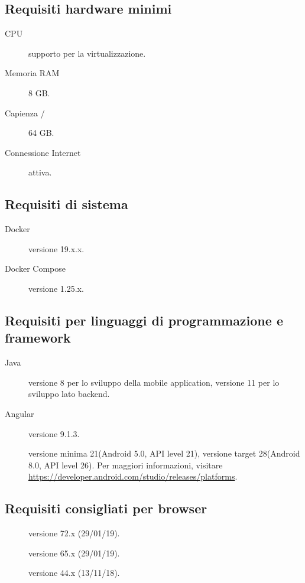 \documentclass[../../manuale-manutentore.tex]{subfiles}
\begin{document}
\subsection{Requisiti hardware minimi}%
\label{sub:requisiti_hardware_minimi}

\begin{description}
    \item[CPU] supporto per la virtualizzazione.
    \item[Memoria RAM] 8 GB\@.
    \item[Capienza /] 64 GB\@.
    \item[Connessione Internet] attiva.
\end{description}

\subsection{Requisiti di sistema}%
\label{sub:requisiti_di_sistema}

\begin{description}
    \item[Docker] versione 19.x.x.
    \item[Docker Compose] versione 1.25.x.
\end{description}

\subsection{Requisiti per linguaggi di programmazione e framework}%
\label{sub:requisiti_per_linguaggi_di_programmazione_e_framwework}

\begin{description}
  \item[Java] versione 8 per lo sviluppo della mobile application, versione 11 per lo sviluppo lato backend.
  \item[Angular] versione 9.1.3.
  \item[] versione minima 21(Android 5.0, API level 21), versione target 28(Android 8.0, API level 26). Per maggiori informazioni, visitare \href{https://developer.android.com/studio/releases/platforms}{https://developer.android.com/studio/releases/platforms}.
\end{description}

\subsection{Requisiti consigliati per browser}%
\label{sub:requisiti_consigliati per browser}

\begin{description}
  \item[] versione 72.x (29/01/19).
  \item[] versione 65.x (29/01/19).
  \item[] versione 44.x (13/11/18).
\end{description}
\end{document}
